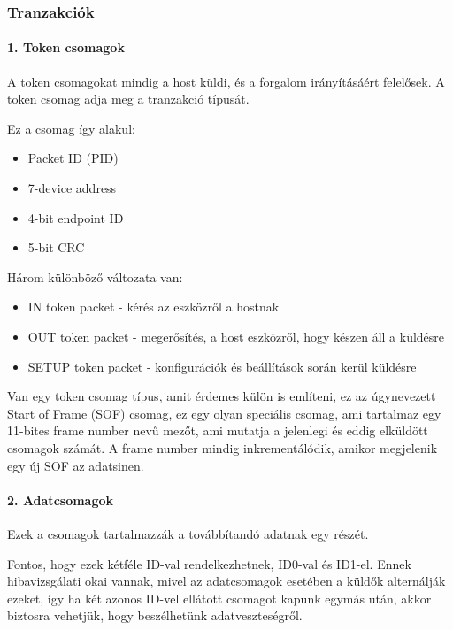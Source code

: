 \subsubsection*{Tranzakciók}

\paragraph{1. Token csomagok}

A token csomagokat mindig a host küldi, és a forgalom irányításáért felelősek. A token csomag adja meg a tranzakció típusát.

Ez a csomag így alakul:
\begin{itemize}
	\item Packet ID (PID)
	\item 7-device address
	\item 4-bit endpoint ID
	\item 5-bit CRC
\end{itemize}

Három különböző változata van:

\begin{itemize}
	\item IN token packet - kérés az eszközről a hostnak
	\item OUT token packet - megerősítés, a host eszközről, hogy készen áll a küldésre
	\item SETUP token packet - konfigurációk és beállítások során kerül küldésre
\end{itemize}

Van egy token csomag típus, amit érdemes külön is említeni, ez az úgynevezett Start of Frame (SOF) csomag, ez egy olyan speciális csomag, ami tartalmaz egy 11-bites frame number nevű mezőt, ami mutatja a jelenlegi és eddig elküldött csomagok számát. A frame number mindig inkrementálódik, amikor megjelenik egy új SOF az adatsinen.

\paragraph{2. Adatcsomagok}

Ezek a csomagok tartalmazzák a továbbítandó adatnak egy részét.

Fontos, hogy ezek kétféle ID-val rendelkezhetnek, ID0-val és ID1-el. Ennek hibavizsgálati okai vannak, mivel az adatcsomagok esetében a küldők alternálják ezeket, így ha két azonos ID-vel ellátott csomagot kapunk egymás után, akkor biztosra vehetjük, hogy beszélhetünk adatveszteségről.

